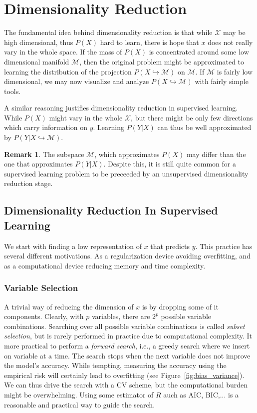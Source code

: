 \documentclass[12pt,a4paper]{article}
\theoremstyle{plain}
\theoremstyle{definition}
\newtheorem{remark}{Remark}
\newcommand{\dist}{P}
\newcommand{\risk}{R}
\newcommand{\featureS}{\mathcal{X}}
\newcommand{\manifold}{\mathcal{M}}
\newcommand{\project}{\hookrightarrow}
\begin{document}
\section{Dimensionality Reduction}
\label{sec:dim_reduce}
The fundamental idea behind dimensionality reduction is that while $\featureS$ may be high dimensional, thus $\dist(X)$ hard to learn, there is hope that $x$ does not really vary in the whole space. 
If the mass of $\dist(X)$ is concentrated around some low dimensional manifold $\manifold$, then the original problem might be approximated to learning the distribution of the projection $\dist(X \project \manifold)$ on $\manifold$. 
If $\manifold$ is fairly low dimensional, we may now visualize and analyze $\dist(X \project \manifold)$ with fairly simple tools.

A similar reasoning justifies dimensionality reduction in supervised learning. While $\dist(X)$ might vary in the whole $\featureS$, but there might be only few directions which carry information on $y$. Learning $\dist(Y|X)$ can thus be well approximated by $\dist(Y|X \project \manifold)$.


\begin{remark}
The subspace $\manifold$, which approximates $\dist(X)$ may differ than the one that approximates $\dist(Y|X)$. Despite this, it is still quite common for a supervised learning problem to be preceeded by an unsupervised dimensionality reduction stage.
\end{remark}



\subsection{Dimensionality Reduction In Supervised Learning}
\label{sec:dim_reduce_supervised}
We start with finding a low representation of $x$ that predicts $y$.
This practice has several different motivations. As a regularization device avoiding overfitting, and  as a computational device reducing memory and time complexity. 

\subsubsection{Variable Selection}
A trivial way of reducing the dimension of $x$ is by dropping some of it components. 
Clearly, with $p$ variables, there are $2^p$ possible variable combinations. Searching over all possible variable combinations is called \emph{subset selection}, but is rarely performed in practice due to computational complexity. It more practical to perform a \emph{forward search}, i.e., a greedy search where we insert on variable at a time.
The search stops when the next variable does not improve the model's accuracy. 
While tempting, measuring the accuracy using the empirical risk will certainly lead to overfitting (see Figure~\ref{fig:bias_variance}).
We can thus drive the search with a CV scheme, but the computational burden might be overwhelming. Using some estimator of $\risk$ auch as AIC, BIC,... is a reasonable and practical way to guide the search.
\end{document}

